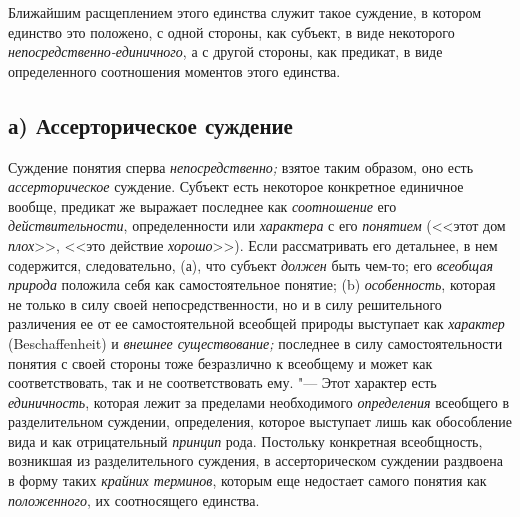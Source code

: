 Ближайшим расщеплением этого единства служит такое суждение, в
котором единство это положено, с одной стороны, как субъект, в виде
некоторого
{\em непосредственно-единичного},
а с другой стороны, как предикат, в виде определенного
соотношения моментов этого единства.

\subsection[а) Ассерторическое суждение]{а) Ассерторическое суждение}

Суждение понятия сперва
{\em непосредственно;}
взятое таким образом, оно есть
{\em ассерторическое}
суждение. Субъект есть некоторое конкретное единичное вообще,
предикат же выражает последнее как
{\em соотношение} его
{\em действительности},
определенности или
{\em характера} с его
{\em понятием} (<<этот дом
{\em плох}>>, <<это
действие {\em хорошо}>>).
Если рассматривать его детальнее, в нем содержится,
следовательно, (а), что субъект
{\em должен} быть чем-то;
его {\em всеобщая природа}
положила себя как самостоятельное понятие; (b)
{\em особенность},
которая не только в силу своей непосредственности, но и в
силу решительного различения ее от ее самостоятельной всеобщей природы
выступает как {\em характер}
(Beschaf\-fenheit) и
{\em внешнее существование;}
последнее в силу самостоятельности понятия с своей стороны
тоже безразлично к всеобщему и может как соответствовать, так и не
соответствовать ему. "--- Этот характер есть
{\em единичность},
которая лежит за пределами необходимого
{\em определения}
всеобщего в разделительном суждении, определения, которое
выступает лишь как обособление вида и как отрицательный
{\em принцип} рода.
Постольку конкретная всеобщность, возникшая из разделительного суждения, в
ассерторическом суждении раздвоена в форму таких
{\em крайних терминов},
которым еще недостает самого понятия как
{\em положенного}, их
соотносящего
единства.

